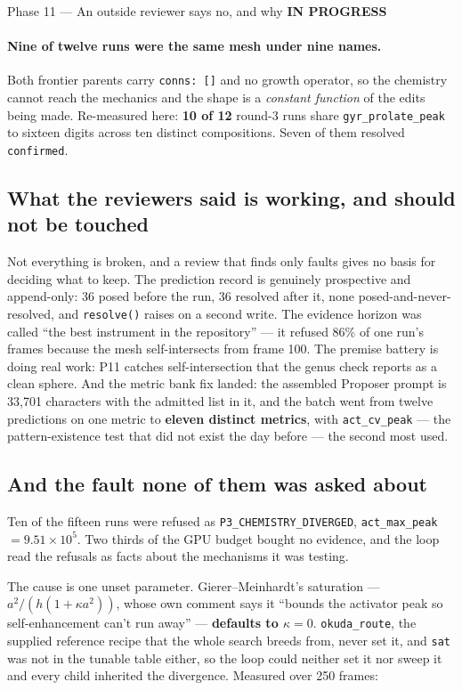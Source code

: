 \documentclass[11pt,a4paper]{article}
\newcommand{\code}[1]{\texttt{#1}}
\newcommand{\prog}{\textcolor{warn}{\textbf{IN PROGRESS}}}
\begin{document}
\begin{phasebox}{Phase 11 --- An outside reviewer says no, and why \hfill \prog}
\paragraph{Nine of twelve runs were the same mesh under nine names.} Both frontier parents carry
\code{conns: []} and no growth operator, so the chemistry cannot reach the mechanics and the shape
is a \emph{constant function} of the edits being made. Re-measured here: \textbf{10 of 12} round-3
runs share \code{gyr\_prolate\_peak} to sixteen digits across ten distinct compositions. Seven of
them resolved \code{confirmed}.

\subsection*{What the reviewers said is working, and should not be touched}
Not everything is broken, and a review that finds only faults gives no basis for deciding what to
keep. The prediction record is genuinely prospective and append-only: 36 posed before the run, 36
resolved after it, none posed-and-never-resolved, and \code{resolve()} raises on a second write.
The evidence horizon was called ``the best instrument in the repository'' --- it refused 86\% of
one run's frames because the mesh self-intersects from frame 100. The premise battery is doing real
work: P11 catches self-intersection that the genus check reports as a clean sphere. And the metric
bank fix landed: the assembled Proposer prompt is 33,701 characters with the admitted list in it,
and the batch went from twelve predictions on one metric to \textbf{eleven distinct metrics}, with
\code{act\_cv\_peak} --- the pattern-existence test that did not exist the day before --- the
second most used.

\subsection*{And the fault none of them was asked about}
Ten of the fifteen runs were refused as \code{P3\_CHEMISTRY\_DIVERGED}, \code{act\_max\_peak}
$=9.51\times10^{5}$. Two thirds of the GPU budget bought no evidence, and the loop read the
refusals as facts about the mechanisms it was testing.

The cause is one unset parameter. Gierer--Meinhardt's saturation --- $a^2/(h(1+\kappa a^2))$,
whose own comment says it ``bounds the activator peak so self-enhancement can't run away'' ---
\textbf{defaults to $\kappa = 0$}. \code{okuda\_route}, the supplied reference recipe that the
whole search breeds from, never set it, and \code{sat} was not in the tunable table either, so the
loop could neither set it nor sweep it and every child inherited the divergence. Measured over 250
frames:


\end{phasebox}
\end{document}
